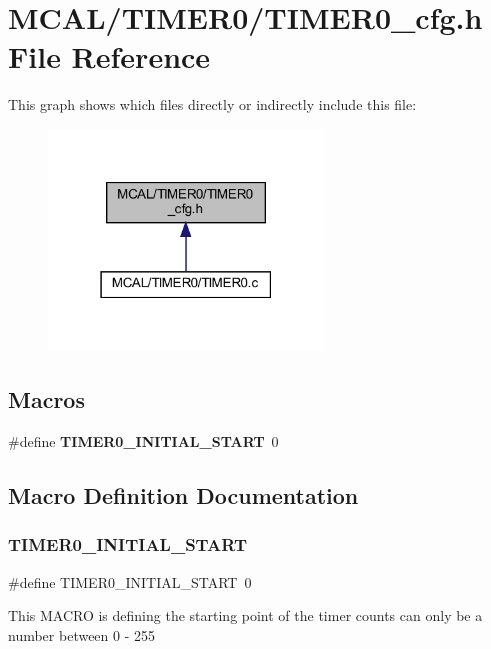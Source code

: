 \section{M\+C\+A\+L/\+T\+I\+M\+E\+R0/\+T\+I\+M\+E\+R0\+\_\+cfg.h File Reference}
\label{_t_i_m_e_r0__cfg_8h}
This graph shows which files directly or indirectly include this file\+:
\nopagebreak
\begin{figure}[H]
\begin{center}
\leavevmode
\includegraphics[width=207pt]{_t_i_m_e_r0__cfg_8h__dep__incl}
\end{center}
\end{figure}
\subsection*{Macros}
\begin{DoxyCompactItemize}
\item 
\#define \textbf{ T\+I\+M\+E\+R0\+\_\+\+I\+N\+I\+T\+I\+A\+L\+\_\+\+S\+T\+A\+RT}~0
\end{DoxyCompactItemize}


\subsection{Macro Definition Documentation}
\mbox{\label{_t_i_m_e_r0__cfg_8h_a258e8280aa84229b8782be363c19df8b}} 
\subsubsection{T\+I\+M\+E\+R0\+\_\+\+I\+N\+I\+T\+I\+A\+L\+\_\+\+S\+T\+A\+RT}
{\footnotesize\ttfamily \#define T\+I\+M\+E\+R0\+\_\+\+I\+N\+I\+T\+I\+A\+L\+\_\+\+S\+T\+A\+RT~0}

This M\+A\+C\+RO is defining the starting point of the timer counts can only be a number between 0 -\/ 255 